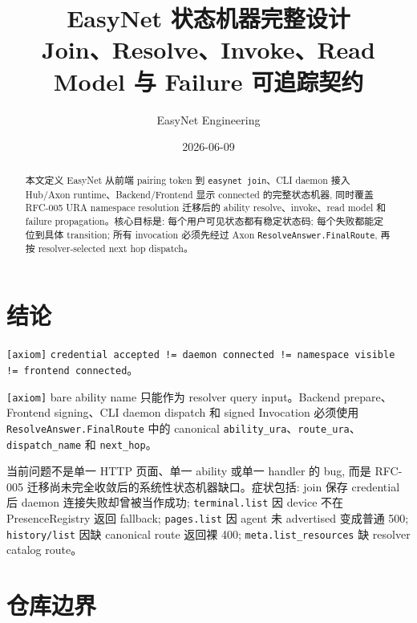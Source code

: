 \documentclass[11pt]{article}
\title{\textbf{EasyNet 状态机器完整设计}\\
\large Join、Resolve、Invoke、Read Model 与 Failure 可追踪契约}
\author{EasyNet Engineering}
\date{2026-06-09}
\newcommand{\tagaxiom}{\textcolor{axonblue}{\texttt{[axiom]}}}
\newcommand{\code}[1]{\texttt{#1}}
\begin{document}
\maketitle

\begin{abstract}
本文定义 EasyNet 从前端 pairing token 到 \code{easynet join}、CLI daemon 接入 Hub/Axon runtime、Backend/Frontend 显示 connected 的完整状态机器, 同时覆盖 RFC-005 URA namespace resolution 迁移后的 ability resolve、invoke、read model 和 failure propagation。核心目标是: 每个用户可见状态都有稳定状态码; 每个失败都能定位到具体 transition; 所有 invocation 必须先经过 Axon \code{ResolveAnswer.FinalRoute}, 再按 resolver-selected next hop dispatch。
\end{abstract}

\tableofcontents
\newpage

\section{结论}

\begin{invariantbox}
\tagaxiom{} \code{credential accepted != daemon connected != namespace visible != frontend connected}。
\end{invariantbox}

\begin{invariantbox}
\tagaxiom{} bare ability name 只能作为 resolver query input。Backend prepare、Frontend signing、CLI daemon dispatch 和 signed Invocation 必须使用 \code{ResolveAnswer.FinalRoute} 中的 canonical \code{ability\_ura}、\code{route\_ura}、\code{dispatch\_name} 和 \code{next\_hop}。
\end{invariantbox}

当前问题不是单一 HTTP 页面、单一 ability 或单一 handler 的 bug, 而是 RFC-005 迁移尚未完全收敛后的系统性状态机器缺口。症状包括: join 保存 credential 后 daemon 连接失败却曾被当作成功; \code{terminal.list} 因 device 不在 PresenceRegistry 返回 fallback; \code{pages.list} 因 agent 未 advertised 变成普通 500; \code{history/list} 因缺 canonical route 返回裸 400; \code{meta.list\_resources} 缺 resolver catalog route。

\section{仓库边界}
\end{document}
